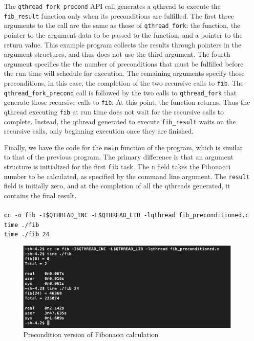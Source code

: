 \documentclass[12pt,fullpage]{article}
\begin{document}
The {\tt qthread\_fork\_precond} API call generates a qthread to execute the {\tt fib\_result} function only when its preconditions are fulfilled.  The first three arguments to the call are the same as those of {\tt qthread\_fork}: the function, the pointer to the argument data to be passed to the function, and a pointer to the return value.  This example program collects the results through pointers in the argument structures, and thus does not use the third argument.  The fourth argument specifies the the number of preconditions that must be fulfilled before the run time will schedule for execution.  The remaining arguments specify those preconditions, in this case, the completion of the two recursive calls to {\tt fib}.  The {\tt qthread\_fork\_precond} call is followed by the two calls to {\tt qthread\_fork} that generate those recursive calls to {\tt fib}.  At this point, the function returns.  Thus the qthread executing {\tt fib} at run time does not wait for the recursive calls to complete.  Instead, the qthread generated to execute {\tt fib\_result} waits on the recursive calls, only beginning execution once they are finished.

Finally, we have the code for the {\tt main} function of the program, which is similar to that of the previous program.  The primary difference is that an argument structure is initialized for the first {\tt fib} task.  The {\tt n} field takes the Fibonacci number to be calculated, as specified by the command line argument.  The {\tt result} field is initially zero, and at the completion of all the qthreads generated, it contains the final result.
\\ \\
{\footnotesize{\tt cc -o fib -I\$QTHREAD\_INC -L\$QTHREAD\_LIB -lqthread fib\_preconditioned.c}}
\\
{\footnotesize{\tt time ./fib}}
\\
{\footnotesize{\tt time ./fib 24}}
\newpage

\begin{figure}[h]
\includegraphics[scale=0.95]{fib_preconditioned.png}
\caption{Precondition version of Fibonacci calculation}
\end{figure}
\end{document}
